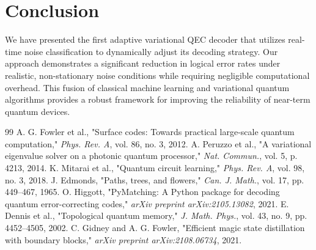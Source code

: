 \documentclass[journal,twocolumn]{IEEEtran}
\begin{document}
\section{Conclusion}

We have presented the first adaptive variational QEC decoder that utilizes real-time noise classification to dynamically adjust its decoding strategy. Our approach demonstrates a significant reduction in logical error rates under realistic, non-stationary noise conditions while requiring negligible computational overhead. This fusion of classical machine learning and variational quantum algorithms provides a robust framework for improving the reliability of near-term quantum devices.


\begin{thebibliography}{99}
 A. G. Fowler et al., "Surface codes: Towards practical large-scale quantum computation," \textit{Phys. Rev. A}, vol. 86, no. 3, 2012.
 A. Peruzzo et al., "A variational eigenvalue solver on a photonic quantum processor," \textit{Nat. Commun.}, vol. 5, p. 4213, 2014.
 K. Mitarai et al., "Quantum circuit learning," \textit{Phys. Rev. A}, vol. 98, no. 3, 2018.
 J. Edmonds, "Paths, trees, and flowers," \textit{Can. J. Math.}, vol. 17, pp. 449--467, 1965.
 O. Higgott, "PyMatching: A Python package for decoding quantum error-correcting codes," \textit{arXiv preprint arXiv:2105.13082}, 2021.
 E. Dennis et al., "Topological quantum memory," \textit{J. Math. Phys.}, vol. 43, no. 9, pp. 4452--4505, 2002.
 C. Gidney and A. G. Fowler, "Efficient magic state distillation with boundary blocks," \textit{arXiv preprint arXiv:2108.06734}, 2021.
\end{thebibliography}
\end{document}
